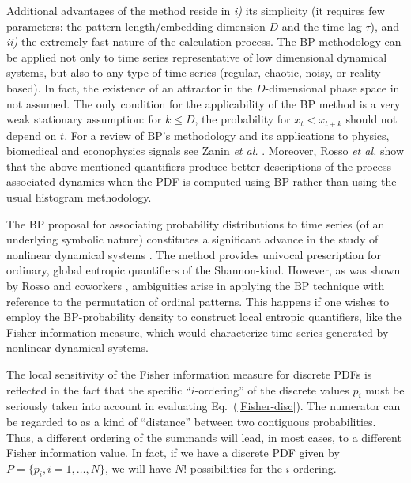 Additional advantages of the  method reside in
{\it i)\/} its simplicity (it requires few parameters: the pattern length/embedding dimension $D$ and the 
time lag $\tau$), and
{\it ii)\/} the extremely fast nature of the calculation process. %
The BP methodology can be applied not only  to time series representative of low dimensional dynamical 
systems, but also to any type of time series (regular, chaotic, noisy, or reality based).
In fact, the existence of an attractor in the $D$-dimensional phase space in not assumed.
The only condition for the applicability of the BP method is  a very weak stationary assumption: for 
$k \leq D$, the probability for $x_t < x_{t+k}$ should not depend on $t$.
For a review of BP's methodology and its applications to physics, biomedical and econophysics signals see 
Zanin {\it et al.\/} \cite{Zanin2012}. 
Moreover, Rosso {\it et al.\/} \cite{Rosso2007} show that the above mentioned quantifiers produce better 
descriptions of the process associated dynamics when the PDF is computed using BP rather than using the 
usual histogram methodology.

The BP proposal for associating probability distributions to time series (of an underlying symbolic 
nature) constitutes a significant advance in the study of nonlinear dynamical systems \cite{Bandt2002}.
The method provides univocal prescription for ordinary, global entropic quantifiers of the Shannon-kind.
However, as was shown by Rosso and coworkers \cite{Olivares2012A,Olivares2012B}, ambiguities arise in 
applying the BP technique with reference to the permutation of ordinal patterns. 
This happens if one wishes to employ the BP-probability density to construct local entropic quantifiers, 
like the Fisher information measure, which would characterize time series generated by nonlinear dynamical 
systems.

The local sensitivity of the Fisher information measure for discrete PDFs is reflected in the fact that the 
specific ``$i$-ordering'' of the discrete values $p_i$ must be seriously taken into account in evaluating 
Eq.~(\ref{Fisher-disc}).
The numerator can be regarded to as a kind of ``distance'' between two contiguous probabilities.
Thus, a different ordering of the summands will lead, in most cases, to a different Fisher information value.
In fact, if we have a discrete PDF given by $P = \{ p_i, i = 1, \ldots , N\}$, we will have $N!$ possibilities 
{for the $i$-ordering.}

